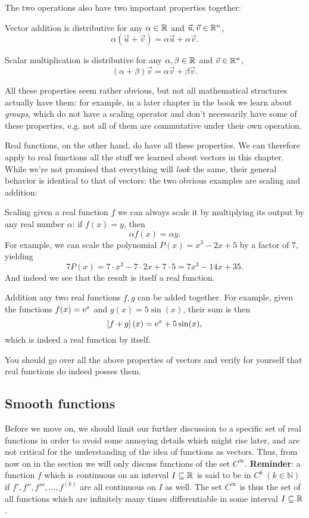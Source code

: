 The two operations also have two important properties together:
\begin{descitemize}
	\item[Vector addition is distributive] for any $\alpha\in\Rs$ and $\vec{u},\vec{v}\in\Rs[n]$,
		\[
			\alpha \left( \vec{u}+\vec{v} \right) = \alpha\vec{u} + \alpha\vec{v}.
		\]
	\item[Scalar multiplication is distributive] for any $\alpha,\beta\in\Rs$ and $\vec{v}\in\Rs[n]$,
		\[
			\left( \alpha+\beta \right) \vec{v} = \alpha\vec{v} + \beta\vec{v}.
		\]
\end{descitemize}

All these properties seem rather obvious, but not all mathematical structures actually have them: for example, in a later chapter in the book we learn about \emph{groups}, which do not have a scaling operator and don't necessarily have some of these properties, e.g. not all of them are commutative under their own operation.

Real functions, on the other hand, do have all these properties. We can therefore apply to real functions all the stuff we learned about vectors in this chapter. While we're not promised that everything will \textit{look} the same, their general behavior is identical to that of vectors: the two obvious examples are scaling and addition:
\begin{descitemize}
	\item[Scaling] given a real function $f$ we can always scale it by multiplying its output by any real number $\alpha$: if $f(x)=y$, then
		\[
			\alpha f(x) = \alpha y.
		\]
		For example, we can scale the polynomial $P(x)=x^{3}-2x+5$ by a factor of $7$, yielding
		\[
			7P(x) = 7\cdot x^{3}-7\cdot2x+7\cdot5 = 7x^{3}-14x+35.
		\]
		And indeed we see that the result is itself a real function.
	\item[Addition] any two real functions $f,g$ can be added together. For example, given the functions $f(x)=\eu^{x}$ and $g(x)=5\sin(x)$, their sum is then
		\[
			\left[ f+g \right](x) = \eu^{x}+5\sin(x),
		\]
		which is indeed a real function by itself.
\end{descitemize}
You should go over all the above properties of vectors and verify for yourself that real functions do indeed posses them.

\subsection{Smooth functions}
Before we move on, we should limit our further discussion to a specific set of real functions in order to avoid some annoying details which might rise later, and are not critical for the understanding of the idea of functions as vectors. Thus, from now on in the section we will only discuss functions of the set $C^{\infty}$. \textbf{Reminder}: a function $f$ which is continuous on an interval $I\subseteq\Rs$ is said to be in $C^{k}\ \left(k\in\mathbb{N}\right)$ if $f',f'',f''',\dots,f^{(k)}$ are all continuous on $I$ as well. The set $C^{\infty}$ is thus the set of all functions which are infinitely many times differentiable in some interval $I\subseteq\Rs$.

